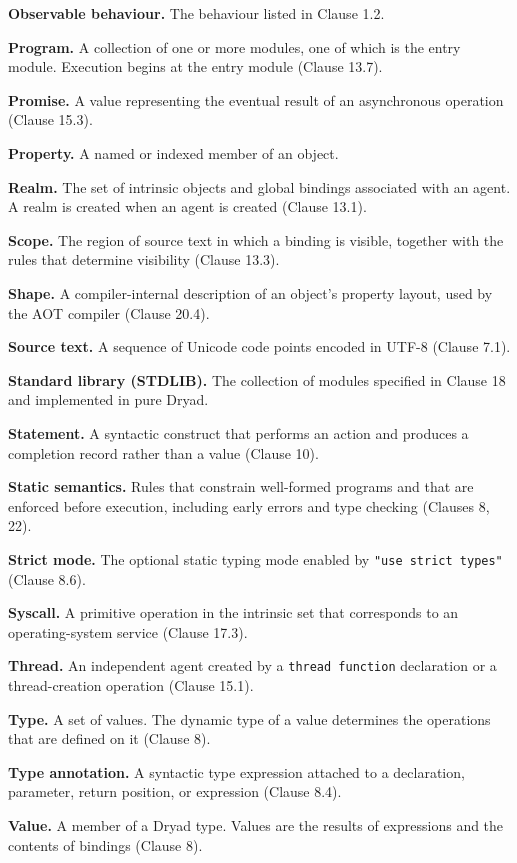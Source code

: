 \documentclass[
  english,
  11pt,
  a4paper,
]{article}
\begin{document}
\textbf{Observable behaviour.} The behaviour listed in Clause 1.2.

\textbf{Program.} A collection of one or more modules, one of which is
the entry module. Execution begins at the entry module (Clause 13.7).

\textbf{Promise.} A value representing the eventual result of an
asynchronous operation (Clause 15.3).

\textbf{Property.} A named or indexed member of an object.

\textbf{Realm.} The set of intrinsic objects and global bindings
associated with an agent. A realm is created when an agent is created
(Clause 13.1).

\textbf{Scope.} The region of source text in which a binding is visible,
together with the rules that determine visibility (Clause 13.3).

\textbf{Shape.} A compiler-internal description of an object's property
layout, used by the AOT compiler (Clause 20.4).

\textbf{Source text.} A sequence of Unicode code points encoded in UTF-8
(Clause 7.1).

\textbf{Standard library (STDLIB).} The collection of modules specified
in Clause 18 and implemented in pure Dryad.

\textbf{Statement.} A syntactic construct that performs an action and
produces a completion record rather than a value (Clause 10).

\textbf{Static semantics.} Rules that constrain well-formed programs and
that are enforced before execution, including early errors and type
checking (Clauses 8, 22).

\textbf{Strict mode.} The optional static typing mode enabled by
\texttt{"use\ strict\ types"} (Clause 8.6).

\textbf{Syscall.} A primitive operation in the intrinsic set that
corresponds to an operating-system service (Clause 17.3).

\textbf{Thread.} An independent agent created by a
\texttt{thread\ function} declaration or a thread-creation operation
(Clause 15.1).

\textbf{Type.} A set of values. The dynamic type of a value determines
the operations that are defined on it (Clause 8).

\textbf{Type annotation.} A syntactic type expression attached to a
declaration, parameter, return position, or expression (Clause 8.4).

\textbf{Value.} A member of a Dryad type. Values are the results of
expressions and the contents of bindings (Clause 8).
\end{document}
